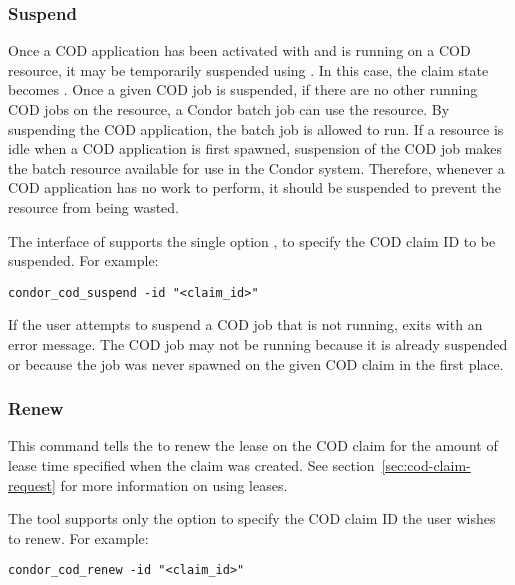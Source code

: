 \subsubsection{\label{sec:cod-claim-suspend}Suspend}

Once a COD application has been activated with 
and is running on a COD resource, it may be temporarily suspended
using .
In this case, the claim state becomes \verb@Suspended@.
Once a given COD job is suspended, if there are no other running COD
jobs on the resource, a Condor batch job can use the resource.
By suspending the COD application, the batch job is allowed to run.
If a resource is idle when a COD application is first spawned,
suspension of the COD job makes the batch resource available
for use in the Condor system.
Therefore, whenever a COD application has no work to perform, it should be
suspended to prevent the resource from being wasted.

The interface of 
supports the single option , to specify the COD claim ID
to be suspended.
For example:
\begin{verbatim}
condor_cod_suspend -id "<claim_id>"
\end{verbatim}

If the user attempts to suspend a COD job that is not running,
 exits with an error message.
The COD job may not be running 
because it is already suspended or because the job was never spawned on
the given COD claim in the first place.


\subsubsection{\label{sec:cod-claim-resume}Renew}

This command tells the  to renew the lease on the COD
claim for the amount of lease time specified when the claim was
created.  See section~\ref{sec:cod-claim-request} for more information
on using leases.

The  tool supports only the  option to
specify the COD claim ID the user wishes to renew.
For example:
\begin{verbatim}
condor_cod_renew -id "<claim_id>"
\end{verbatim}

